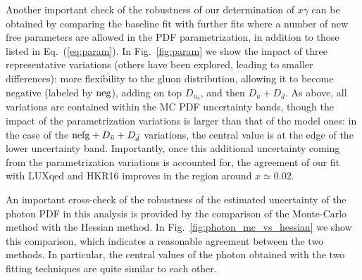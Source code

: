 Another important check of the robustness of our determination of
$x\gamma$ can be obtained by comparing the baseline fit with further
fits where a number of new free parameters are allowed in the PDF
parametrization, in addition to those listed in Eq.~(\ref{eq:param}).
%
In Fig.~\ref{fig:param} we show the impact of three representative
variations (others have been explored, leading to smaller
differences): more flexibility to the gluon distribution, allowing it
to become negative (labeled by ${\rm neg}$), adding on top $D_{u_v}$,
and then $D_{\bar{u}}+D_{\bar{d}}$.
%
As above, all variations are contained within the MC PDF uncertainty
bands, though the impact of the parametrization variations is larger
than that of the model ones: in the case of the
${\rm nefg}+D_{\bar{u}}+D_{\bar{d}}$ variations, the central value is
at the edge of the lower uncertainty band.
%
Importantly, once this additional uncertainty coming from the
parametrization variations is accounted for, the agreement of our fit
with LUXqed and HKR16 improves in the region around $x\simeq 0.02$.

An important cross-check of the robustness of the estimated
uncertainty of the photon PDF in this analysis is provided by the
comparison of the Monte-Carlo method with the Hessian method.
%
In Fig.~\ref{fig:photon_mc_vs_hessian} we show this comparison, which
indicates a reasonable agreement between the two methods.
%
In particular, the central values of the photon obtained with the two
fitting techniques are quite similar to each other.

